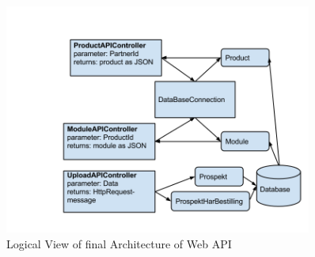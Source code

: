 \begin{center}
\begin{figure}[H]
\centering
\includegraphics[width=0.9\textwidth]{images/architecture_finalwebapi01.png}
\caption{Logical View of final Architecture of Web API}
\label{fig:process_view_webapi}
\end{figure}
\end{center}


